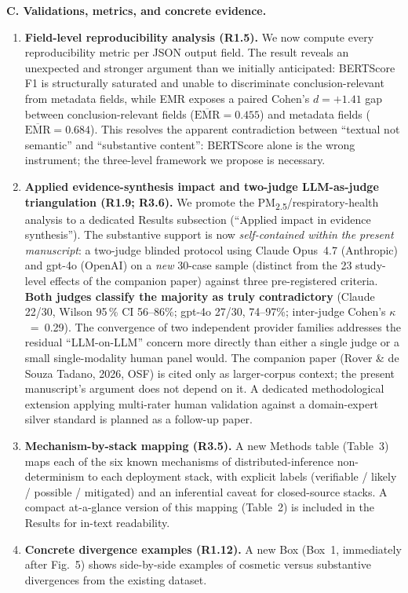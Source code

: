 \documentclass[11pt,a4paper]{article}
\begin{document}
\medskip
\noindent\textbf{C. Validations, metrics, and concrete evidence.}
\begin{enumerate}[leftmargin=*,resume]
  \item \textbf{Field-level reproducibility analysis (R1.5).} We now compute every reproducibility metric per JSON output field. The result reveals an unexpected and stronger argument than we initially anticipated: BERTScore F1 is structurally saturated and unable to discriminate conclusion-relevant from metadata fields, while EMR exposes a paired Cohen's $d=+1.41$ gap between conclusion-relevant fields ($\overline{\text{EMR}}=0.455$) and metadata fields ($\overline{\text{EMR}}=0.684$). This resolves the apparent contradiction between ``textual not semantic'' and ``substantive content'': BERTScore alone is the wrong instrument; the three-level framework we propose is necessary.

  \item \textbf{Applied evidence-synthesis impact and two-judge LLM-as-judge triangulation (R1.9; R3.6).} We promote the PM\textsubscript{2.5}/respiratory-health analysis to a dedicated Results subsection (``Applied impact in evidence synthesis''). The substantive support is now \emph{self-contained within the present manuscript}: a two-judge blinded protocol using Claude Opus~4.7 (Anthropic) and gpt-4o (OpenAI) on a \emph{new} 30-case sample (distinct from the 23 study-level effects of the companion paper) against three pre-registered criteria. \textbf{Both judges classify the majority as truly contradictory} (Claude 22/30, Wilson 95\,\% CI 56--86\%; gpt-4o 27/30, 74--97\%; inter-judge Cohen's $\kappa$~=~0.29). The convergence of two independent provider families addresses the residual ``LLM-on-LLM'' concern more directly than either a single judge or a small single-modality human panel would. The companion paper (Rover \& de Souza Tadano, 2026, OSF) is cited only as larger-corpus context; the present manuscript's argument does not depend on it. A dedicated methodological extension applying multi-rater human validation against a domain-expert silver standard is planned as a follow-up paper.

  \item \textbf{Mechanism-by-stack mapping (R3.5).} A new Methods table (Table~3) maps each of the six known mechanisms of distributed-inference non-determinism to each deployment stack, with explicit labels (verifiable / likely / possible / mitigated) and an inferential caveat for closed-source stacks. A compact at-a-glance version of this mapping (Table~2) is included in the Results for in-text readability.

  \item \textbf{Concrete divergence examples (R1.12).} A new Box (Box~1, immediately after Fig.~5) shows side-by-side examples of cosmetic versus substantive divergences from the existing dataset.
\end{enumerate}
\end{document}
